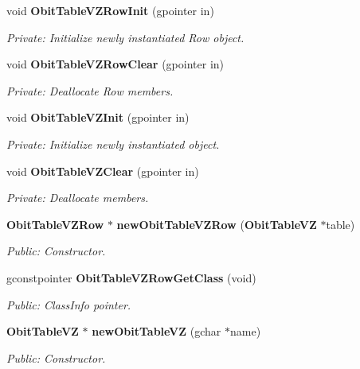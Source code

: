 \begin{CompactItemize}
\item 
void {\bf Obit\-Table\-VZRow\-Init} (gpointer in)
\begin{CompactList}\small\item\em Private: Initialize newly instantiated Row object. \item\end{CompactList}\item 
void {\bf Obit\-Table\-VZRow\-Clear} (gpointer in)
\begin{CompactList}\small\item\em Private: Deallocate Row members. \item\end{CompactList}\item 
void {\bf Obit\-Table\-VZInit} (gpointer in)
\begin{CompactList}\small\item\em Private: Initialize newly instantiated object. \item\end{CompactList}\item 
void {\bf Obit\-Table\-VZClear} (gpointer in)
\begin{CompactList}\small\item\em Private: Deallocate members. \item\end{CompactList}\item 
{\bf Obit\-Table\-VZRow} $\ast$ {\bf new\-Obit\-Table\-VZRow} ({\bf Obit\-Table\-VZ} $\ast$table)
\begin{CompactList}\small\item\em Public: Constructor. \item\end{CompactList}\item 
gconstpointer {\bf Obit\-Table\-VZRow\-Get\-Class} (void)
\begin{CompactList}\small\item\em Public: Class\-Info pointer. \item\end{CompactList}\item 
{\bf Obit\-Table\-VZ} $\ast$ {\bf new\-Obit\-Table\-VZ} (gchar $\ast$name)
\begin{CompactList}\small\item\em Public: Constructor. \item\end{CompactList}\item 

\end{CompactItemize}
